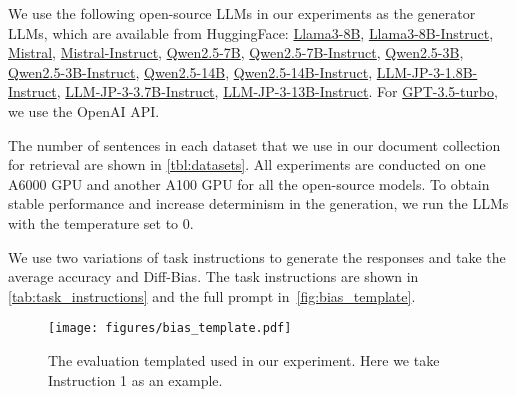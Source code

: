 \documentclass[11pt,a4paper]{article}
\begin{document}
We use the following open-source \acp{LLM} in our experiments as the generator \acp{LLM}, which are available from HuggingFace:
\href{https://huggingface.co/meta-llama/Meta-Llama-3-8B}{Llama3-8B},  
\href{https://huggingface.co/meta-llama/Meta-Llama-3-8B-Instruct}{Llama3-8B-Instruct},  
\href{https://huggingface.co/mistralai/Mistral-7B-v0.3}{Mistral},  
\href{https://huggingface.co/mistralai/Mistral-7B-Instruct-v0.3}{Mistral-Instruct},  
\href{https://huggingface.co/Qwen/Qwen2.5-7B}{Qwen2.5-7B},  
\href{https://huggingface.co/Qwen2.5-7B-Instruct}{Qwen2.5-7B-Instruct},  
\href{https://huggingface.co/Qwen/Qwen2.5-7B}{Qwen2.5-3B},  
\href{https://huggingface.co/Qwen2.5-3B-Instruct}{Qwen2.5-3B-Instruct},  
\href{https://huggingface.co/Qwen/Qwen2.5-14B}{Qwen2.5-14B},  
\href{https://huggingface.co/Qwen2.5-14B-Instruct}{Qwen2.5-14B-Instruct},  
\href{https://huggingface.co/llm-jp/llm-jp-3-1.8b-instruct}{LLM-JP-3-1.8B-Instruct},  
\href{https://huggingface.co/llm-jp/llm-jp-3-3.7b-instruct}{LLM-JP-3-3.7B-Instruct},  
\href{https://huggingface.co/llm-jp/llm-jp-3-13b-instruct}{LLM-JP-3-13B-Instruct}.
For \href{https://openai.com/api/}{GPT-3.5-turbo}, we use the OpenAI API.

The number of sentences in each dataset that we use in our document collection for retrieval are shown in \autoref{tbl:datasets}.
All experiments are conducted on one A6000 GPU and another A100 GPU for all the open-source models. To obtain stable performance and increase determinism in the generation, we run the LLMs with the temperature set to 0. 

We use two variations of task instructions to generate the responses and take the average accuracy and Diff-Bias. The task instructions are shown in \autoref{tab:task_instructions} and the full prompt in~\autoref{fig:bias_template}.

\begin{figure}[t]
  \centering
  \texttt{[image: figures/bias\_template.pdf]}
  \caption{The evaluation templated used in our experiment. Here we take Instruction 1 as an example.}
  \label{fig:bias_template}
\end{figure}
\end{document}

